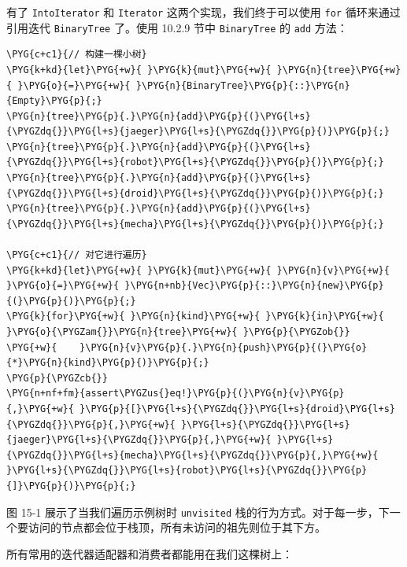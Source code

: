 有了 \texttt{IntoIterator} 和 \texttt{Iterator} 这两个实现，我们终于可以使用 \texttt{for} 循环来通过引用迭代 \texttt{BinaryTree} 了。使用 10.2.9 节中 \texttt{BinaryTree} 的 \texttt{add} 方法：

\begin{Verbatim}[commandchars=\\\{\},breaklines=true,breakanywhere=true,fontsize=\codefont,xleftmargin=17bp]
\PYG{c+c1}{// 构建一棵小树}
\PYG{k+kd}{let}\PYG{+w}{ }\PYG{k}{mut}\PYG{+w}{ }\PYG{n}{tree}\PYG{+w}{ }\PYG{o}{=}\PYG{+w}{ }\PYG{n}{BinaryTree}\PYG{p}{::}\PYG{n}{Empty}\PYG{p}{;}
\PYG{n}{tree}\PYG{p}{.}\PYG{n}{add}\PYG{p}{(}\PYG{l+s}{\PYGZdq{}}\PYG{l+s}{jaeger}\PYG{l+s}{\PYGZdq{}}\PYG{p}{)}\PYG{p}{;}
\PYG{n}{tree}\PYG{p}{.}\PYG{n}{add}\PYG{p}{(}\PYG{l+s}{\PYGZdq{}}\PYG{l+s}{robot}\PYG{l+s}{\PYGZdq{}}\PYG{p}{)}\PYG{p}{;}
\PYG{n}{tree}\PYG{p}{.}\PYG{n}{add}\PYG{p}{(}\PYG{l+s}{\PYGZdq{}}\PYG{l+s}{droid}\PYG{l+s}{\PYGZdq{}}\PYG{p}{)}\PYG{p}{;}
\PYG{n}{tree}\PYG{p}{.}\PYG{n}{add}\PYG{p}{(}\PYG{l+s}{\PYGZdq{}}\PYG{l+s}{mecha}\PYG{l+s}{\PYGZdq{}}\PYG{p}{)}\PYG{p}{;}

\PYG{c+c1}{// 对它进行遍历}
\PYG{k+kd}{let}\PYG{+w}{ }\PYG{k}{mut}\PYG{+w}{ }\PYG{n}{v}\PYG{+w}{ }\PYG{o}{=}\PYG{+w}{ }\PYG{n+nb}{Vec}\PYG{p}{::}\PYG{n}{new}\PYG{p}{(}\PYG{p}{)}\PYG{p}{;}
\PYG{k}{for}\PYG{+w}{ }\PYG{n}{kind}\PYG{+w}{ }\PYG{k}{in}\PYG{+w}{ }\PYG{o}{\PYGZam{}}\PYG{n}{tree}\PYG{+w}{ }\PYG{p}{\PYGZob{}}
\PYG{+w}{    }\PYG{n}{v}\PYG{p}{.}\PYG{n}{push}\PYG{p}{(}\PYG{o}{*}\PYG{n}{kind}\PYG{p}{)}\PYG{p}{;}
\PYG{p}{\PYGZcb{}}
\PYG{n+nf+fm}{assert\PYGZus{}eq!}\PYG{p}{(}\PYG{n}{v}\PYG{p}{,}\PYG{+w}{ }\PYG{p}{[}\PYG{l+s}{\PYGZdq{}}\PYG{l+s}{droid}\PYG{l+s}{\PYGZdq{}}\PYG{p}{,}\PYG{+w}{ }\PYG{l+s}{\PYGZdq{}}\PYG{l+s}{jaeger}\PYG{l+s}{\PYGZdq{}}\PYG{p}{,}\PYG{+w}{ }\PYG{l+s}{\PYGZdq{}}\PYG{l+s}{mecha}\PYG{l+s}{\PYGZdq{}}\PYG{p}{,}\PYG{+w}{ }\PYG{l+s}{\PYGZdq{}}\PYG{l+s}{robot}\PYG{l+s}{\PYGZdq{}}\PYG{p}{]}\PYG{p}{)}\PYG{p}{;}
\end{Verbatim}

图 15-1 展示了当我们遍历示例树时 \texttt{unvisited} 栈的行为方式。对于每一步，下一个要访问的节点都会位于栈顶，所有未访问的祖先则位于其下方。


所有常用的迭代器适配器和消费者都能用在我们这棵树上：

